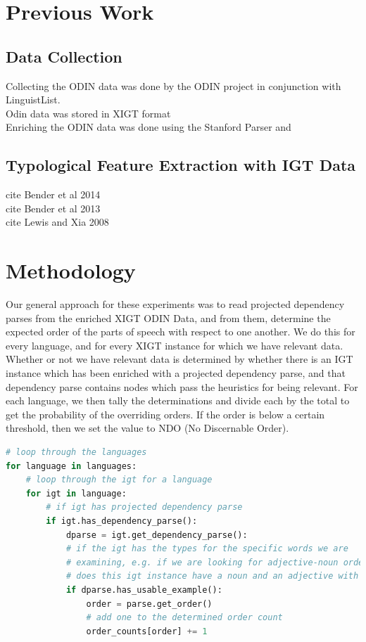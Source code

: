 \documentclass[]{aiaa-tc}
\begin{document}
\section{Previous Work}

\subsection{Data Collection}
Collecting the ODIN data was done by the ODIN project in conjunction with LinguistList.  \cite{lewis2006odin}\\
Odin data was stored in XIGT format \cite{goodman2015xigt}\\
Enriching the ODIN data was done using the Stanford Parser \cite{xia2007multilingual} and \cite{de2006generating}\\

\subsection{Typological Feature Extraction with IGT Data}
cite Bender et al 2014 \cite{bender2014learning}\\
cite Bender et al 2013 \cite{goodman2013towards}\\
cite Lewis and Xia 2008 \cite{lewis2008automatically}\\

\section{Methodology}
Our general approach for these experiments was to read projected dependency parses from the enriched XIGT ODIN Data, and from them, determine the expected order of the parts of speech with respect to one another.  We do this for every language, and for every XIGT instance for which we have relevant data.  Whether or not we have relevant data is determined by whether there is an IGT instance which has been enriched with a projected dependency parse, and that dependency parse contains nodes which pass the heuristics for being relevant.  For each language, we then tally the determinations and divide each by the total to get the probability of the overriding orders.  If the order is below a certain threshold, then we set the value to NDO (No Discernable Order).

\begin{lstlisting}[language=python]
# loop through the languages
for language in languages:
    # loop through the igt for a language
    for igt in language:
        # if igt has projected dependency parse
        if igt.has_dependency_parse():
            dparse = igt.get_dependency_parse():
            # if the igt has the types for the specific words we are 
            # examining, e.g. if we are looking for adjective-noun order,
            # does this igt instance have a noun and an adjective with a head noun
            if dparse.has_usable_example():
                order = parse.get_order()
                # add one to the determined order count
                order_counts[order] += 1
                
\end{lstlisting}
\end{document}
